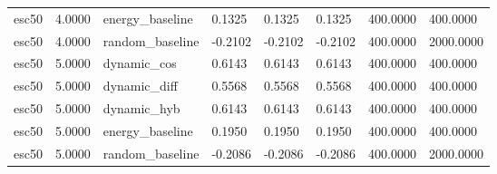 \begin{table}[htbp]
\begin{tabular}{llllllll}
esc50 & 4.0000 & energy\_baseline & 0.1325 & 0.1325 & 0.1325 & 400.0000 & 400.0000 \\
esc50 & 4.0000 & random\_baseline & -0.2102 & -0.2102 & -0.2102 & 400.0000 & 2000.0000 \\
esc50 & 5.0000 & dynamic\_cos & 0.6143 & 0.6143 & 0.6143 & 400.0000 & 400.0000 \\
esc50 & 5.0000 & dynamic\_diff & 0.5568 & 0.5568 & 0.5568 & 400.0000 & 400.0000 \\
esc50 & 5.0000 & dynamic\_hyb & 0.6143 & 0.6143 & 0.6143 & 400.0000 & 400.0000 \\
esc50 & 5.0000 & energy\_baseline & 0.1950 & 0.1950 & 0.1950 & 400.0000 & 400.0000 \\
esc50 & 5.0000 & random\_baseline & -0.2086 & -0.2086 & -0.2086 & 400.0000 & 2000.0000 \\
\bottomrule
\end{tabular}
\end{table}

